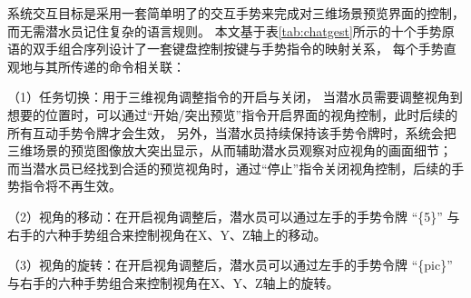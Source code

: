 系统交互目标是采用一套简单明了的交互手势来完成对三维场景预览界面的控制，而无需潜水员记住复杂的语言规则。
本文基于表\ref{tab:chatgest}所示的十个手势原语的双手组合序列设计了一套键盘控制按键与手势指令的映射关系，
每个手势直观地与其所传递的命令相关联：

（1）任务切换：用于三维视角调整指令的开启与关闭，
当潜水员需要调整视角到想要的位置时，可以通过“开始/突出预览”指令开启界面的视角控制，此时后续的所有互动手势令牌才会生效，
另外，当潜水员持续保持该手势令牌时，系统会把三维场景的预览图像放大突出显示，从而辅助潜水员观察对应视角的画面细节；
而当潜水员已经找到合适的预览视角时，通过“停止”指令关闭视角控制，后续的手势指令将不再生效。

（2）视角的移动：在开启视角调整后，潜水员可以通过左手的手势令牌 “\{5\}” 与右手的六种手势组合来控制视角在X、Y、Z轴上的移动。

（3）视角的旋转：在开启视角调整后，潜水员可以通过左手的手势令牌 “\{pic\}” 与右手的六种手势组合来控制视角在X、Y、Z轴上的旋转。

